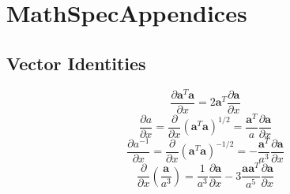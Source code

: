 \chapter{MathSpecAppendices}

\section{Vector Identities}


\begin{equation}
     \frac{\partial \mathbf{a}^T \mathbf{a} }{\partial x } = 2 \mathbf{a}^T
     \frac{\partial \mathbf{a}}{\partial x}
\end{equation}
%
\begin{equation}
     \frac{\partial a }{\partial x }= \frac{\partial  }{\partial x }\left(\mathbf{a}^T \mathbf{a}\right)^{1/2} =
     \frac{\mathbf{a}^T}{a}
     \frac{\partial \mathbf{a}}{\partial x}
\end{equation}
%
\begin{equation}
     \frac{\partial a^{-1} }{\partial x }= \frac{\partial  }{\partial x }\left(\mathbf{a}^T \mathbf{a}\right)^{-1/2}
     =-
     \frac{\mathbf{a}^T}{a^3}
     \frac{\partial \mathbf{a}}{\partial x}
\end{equation}
%
\begin{equation}
    \frac{\partial }{\partial x}\left( \frac{\mathbf{a}}{a^3} \right) =
    \frac{1}{a^3}\frac{\partial \mathbf{a} }{\partial x} - 3\frac{\mathbf{a}\mathbf{a}^T}{a^5}\frac{\partial \mathbf{a} }{\partial x}
    \label{Eq:vecIDaveca3}
\end{equation}
